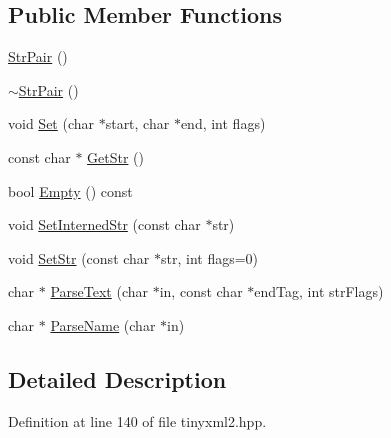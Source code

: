 \subsection*{Public Member Functions}
\begin{DoxyCompactItemize}
\item 
\hyperlink{classtinyxml2_1_1_str_pair_a69153963f7052de9f767d3d8c1623a70}{Str\-Pair} ()
\item 
\hyperlink{classtinyxml2_1_1_str_pair_a60bed84d2503296e1c2a73fcef1431f9}{$\sim$\-Str\-Pair} ()
\item 
void \hyperlink{classtinyxml2_1_1_str_pair_a4f05549373394266a1eecba26813c166}{Set} (char $\ast$start, char $\ast$end, int flags)
\item 
const char $\ast$ \hyperlink{classtinyxml2_1_1_str_pair_ad87e3d11330f5e689ba1e7e54c023b57}{Get\-Str} ()
\item 
bool \hyperlink{classtinyxml2_1_1_str_pair_affa1043e73a18f05d5d2faec055725a7}{Empty} () const 
\item 
void \hyperlink{classtinyxml2_1_1_str_pair_a2baf6230e18333e02ab65d0897ee3941}{Set\-Interned\-Str} (const char $\ast$str)
\item 
void \hyperlink{classtinyxml2_1_1_str_pair_a1f82ec6b5bee35ee7466d8565e43b1de}{Set\-Str} (const char $\ast$str, int flags=0)
\item 
char $\ast$ \hyperlink{classtinyxml2_1_1_str_pair_ad90521f188e9606a8fbafe5d86fb2246}{Parse\-Text} (char $\ast$in, const char $\ast$end\-Tag, int str\-Flags)
\item 
char $\ast$ \hyperlink{classtinyxml2_1_1_str_pair_aa6d8998efceba41d87ec2300c70a6085}{Parse\-Name} (char $\ast$in)
\end{DoxyCompactItemize}


\subsection{Detailed Description}


Definition at line 140 of file tinyxml2.\-hpp.



